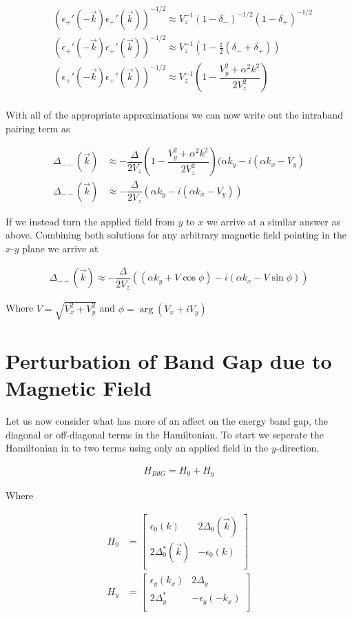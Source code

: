 \begin{align}
  &(\epsilon_+'(-\vec{k})\epsilon_+'(\vec{k}))^{-1/2} \approx V_z^{-1}(1-\delta_-)^{-1/2}(1-\delta_+)^{-1/2} \\
  &(\epsilon_+'(-\vec{k})\epsilon_+'(\vec{k}))^{-1/2} \approx V_z^{-1}(1-\frac{1}{2}(\delta_-+\delta_+)) \\
  &(\epsilon_+'(-\vec{k})\epsilon_+'(\vec{k}))^{-1/2} \approx V_z^{-1}\left(1-\dfrac{V_y^2+\alpha^2k^2}{2V_z^2}\right) \\
\end{align}

With all of the appropriate approximations we can now write out the intraband pairing term as

\begin{align}
  \Delta_{--}(\vec{k}) &\approx -\dfrac{\Delta}{2V_z}\left(1-\dfrac{V_y^2+\alpha^2k^2}{2V_z^2}\right)(\alpha k_y -i(\alpha k_x - V_y) \\
  \Delta_{--}(\vec{k}) &\approx -\dfrac{\Delta}{2V_z}(\alpha k_y - i(\alpha k_x - V_y))
\end{align}

If we instead turn the applied field from $y$ to $x$ we arrive at a similar answer as above. Combining both solutions for any arbitrary magnetic field pointing in the $x$-$y$ plane we arrive at

\begin{align}
  \Delta_{--}(\vec{k}) \approx -\dfrac{\Delta}{2V_z}((\alpha k_y + V\cos{\phi})-i(\alpha k_x - V\sin{\phi}))
\end{align}

Where $V=\sqrt{V_x^2+V_y^2}$ and $\phi=\arg(V_x+iV_y)$

\section{Perturbation of Band Gap due to Magnetic Field}

Let us now consider what has more of an affect on the energy band gap, the diagonal or off-diagonal terms in the Hamiltonian. To start we seperate the Hamiltonian in to two terms using only an applied field in the $y$-direction,

\begin{align}
  H_{BdG} = H_0 + H_y 
\end{align}

Where 

\begin{align}
  H_0 &= 
  \begin{bmatrix}
    \epsilon_0(k) & 2\Delta_0(\vec{k}) \\
    2\Delta_0^*(\vec{k}) & -\epsilon_0(k) \\
  \end{bmatrix} \\
  H_y &= 
  \begin{bmatrix}
    \epsilon_y(k_x) & 2\Delta_y \\
    2\Delta_y^* & -\epsilon_y(-k_x) \\
  \end{bmatrix}
\end{align}

